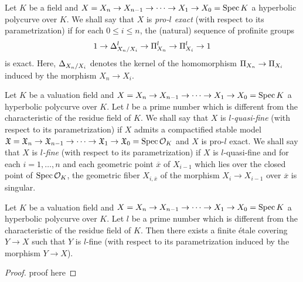 
\begin{defn}
  Let $K$ be a field and $X = X_n \to X_{n - 1} \to \cdots \to X_1 \to X_0 = \mathrm{Spec} \, K$ a hyperbolic polycurve over $K$. We shall say that $X$ is \emph{pro-$l$ exact} (with respect to its parametrization) if for each $0 \leq i \leq n$, the (natural) sequence of profinite groups \[ 1 \to \Delta_{X_n/X_i}^l \to \Pi_{X_n}^l \to \Pi_{X_i}^l \to 1 \] is exact. Here, $\Delta_{X_n/X_i}$ denotes the kernel of the homomorphism $\Pi_{X_n} \to \Pi_{X_i}$ induced by the morphism $X_n \to X_i$.
\end{defn}

\begin{defn}
  Let $K$ be a valuation field and $X = X_n \to X_{n - 1} \to \cdots \to X_1 \to X_0 = \mathrm{Spec} \, K$ a hyperbolic polycurve over $K$. Let $l$ be a prime number which is different from the characteristic of the residue field of $K$. We shall say that $X$ is \emph{$l$-quasi-fine} (with respect to its parametrization) if $X$ admits a compactified stable model $\mathfrak{X} = \mathfrak{X}_n \to \mathfrak{X}_{n - 1} \to \cdots \to \mathfrak{X}_1 \to \mathfrak{X}_0 = \mathrm{Spec} \, \mathcal{O}_K$ and $X$ is pro-$l$ exact. We shall say that $X$ is \emph{$l$-fine} (with respect to its parametrization) if $X$ is $l$-quasi-fine and for each $i = 1, \ldots, n$ and each geometric point $\overline{x}$ of $X_{i - 1}$ which lies over the closed point of $\mathrm{Spec} \, \mathcal{O}_K$, the geometric fiber $X_{i, \overline{x}}$ of the morphism $X_i \to X_{i - 1}$ over $\overline{x}$ is singular. 
\end{defn}

\begin{thm}
  Let $K$ be a valuation field and $X = X_n \to X_{n - 1} \to \cdots \to X_1 \to X_0 = \mathrm{Spec} \, K$ a hyperbolic polycurve over $K$. Let $l$ be a prime number which is different from the characteristic of the residue field of $K$. Then there exists a finite \'{e}tale covering $Y \to X$ such that $Y$ is $l$-fine (with respect to its parametrization induced by the morphism $Y \to X$).
\end{thm}
\begin{proof}
  proof here
\end{proof}